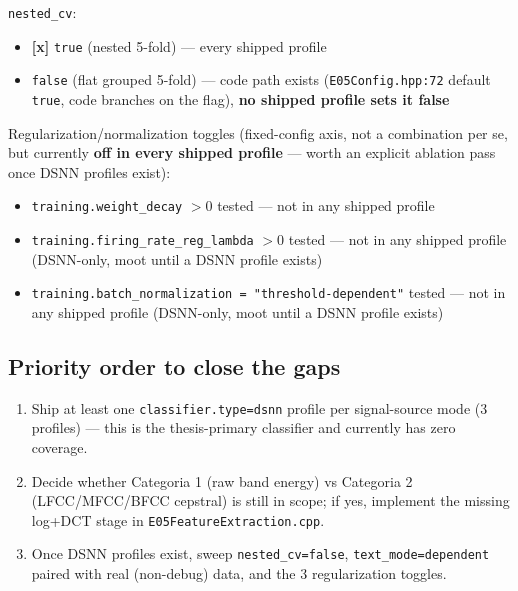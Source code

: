 \texttt{nested\_cv}:
\begin{itemize}
    \item[$\blacksquare$] \textbf{[x]} \texttt{true} (nested 5-fold) --- every shipped profile
    \item[$\square$] \texttt{false} (flat grouped 5-fold) --- code path exists
    (\texttt{E05Config.hpp:72} default \texttt{true}, code branches on the flag), \textbf{no shipped
    profile sets it false}
\end{itemize}

Regularization/normalization toggles (fixed-config axis, not a combination per se, but currently
\textbf{off in every shipped profile} --- worth an explicit ablation pass once DSNN profiles exist):
\begin{itemize}
    \item[$\square$] \texttt{training.weight\_decay} $>0$ tested --- not in any shipped profile
    \item[$\square$] \texttt{training.firing\_rate\_reg\_lambda} $>0$ tested --- not in any shipped
    profile (DSNN-only, moot until a DSNN profile exists)
    \item[$\square$] \texttt{training.batch\_normalization = "threshold-dependent"} tested --- not in
    any shipped profile (DSNN-only, moot until a DSNN profile exists)
\end{itemize}

\subsection*{Priority order to close the gaps}
\begin{enumerate}
    \item Ship at least one \texttt{classifier.type=dsnn} profile per signal-source mode (3 profiles)
    --- this is the thesis-primary classifier and currently has zero coverage.
    \item Decide whether Categoria 1 (raw band energy) vs Categoria 2 (LFCC/MFCC/BFCC cepstral) is
    still in scope; if yes, implement the missing log+DCT stage in \texttt{E05FeatureExtraction.cpp}.
    \item Once DSNN profiles exist, sweep \texttt{nested\_cv=false}, \texttt{text\_mode=dependent}
    paired with real (non-debug) data, and the 3 regularization toggles.
\end{enumerate}

